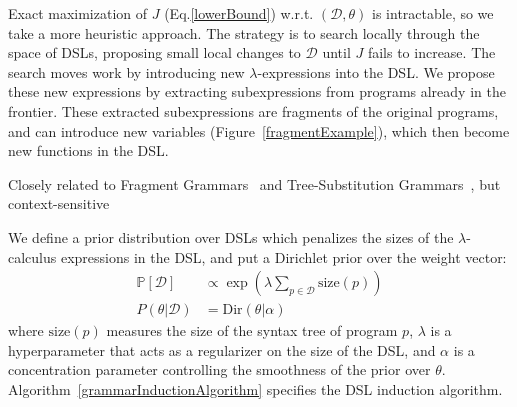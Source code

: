 \documentclass{article}
\newcommand{\probability}{\mathds{P}} %
\begin{document}
Exact maximization of $J$ (Eq.\ref{lowerBound}) w.r.t. $(\mathcal{D},\theta)$
is intractable,
so we take a more heuristic approach.
The strategy is to search locally through the space of DSLs,
proposing small local changes to $\mathcal{D}$ until $J$ fails to increase.
The search moves work by introducing new
$\lambda$-expressions into the DSL.
We propose these new expressions by extracting subexpressions from
programs already in the frontier.
These extracted subexpressions
are fragments of the original programs, and can introduce new variables (Figure~\ref{fragmentExample}),
which then become new functions in the DSL.

Closely related to Fragment Grammars~\cite{tim} and Tree-Substitution Grammars~\cite{cohn2010inducing},
but context-sensitive

We define a prior distribution over DSLs which penalizes the sizes of the $\lambda$-calculus expressions in the DSL, and put a Dirichlet prior over the weight vector:
\begin{align*}
  \probability[\mathcal{D}]&\propto\exp\left(\lambda\sum_{p\in \mathcal{D}}\text{size}(p) \right)\\
  P(\theta|\mathcal{D})& = \text{Dir}(\theta|\alpha)
\end{align*}
where $\text{size}(p)$  measures the size of the syntax tree of program $p$,
$\lambda$ is a hyperparameter that acts as a regularizer on the size of the DSL,
and $\alpha$ is a concentration parameter controlling the smoothness of the prior over $\theta$.
Algorithm~\ref{grammarInductionAlgorithm} specifies the DSL induction algorithm.
\end{document}
